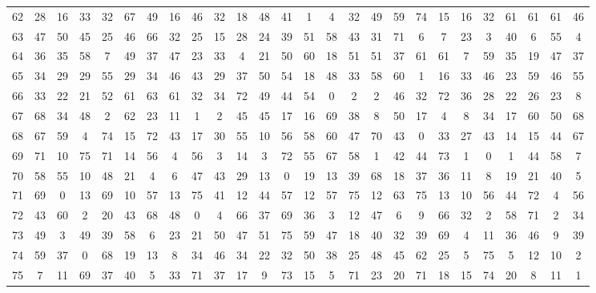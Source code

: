 \begin{table}
\begin{tabular}{c c c c c c c c c c c c c c c c c c c c c c c c c c }
62 & 28 & 16 & 33 & 32 & 67 & 49 & 16 & 46 & 32 & 18 & 48 & 41 & 1 & 4 & 32 & 49 & 59 & 74 & 15 & 16 & 32 & 61 & 61 & 61 & 46 \\
63 & 47 & 50 & 45 & 25 & 46 & 66 & 32 & 25 & 15 & 28 & 24 & 39 & 51 & 58 & 43 & 31 & 71 & 6 & 7 & 23 & 3 & 40 & 6 & 55 & 4 \\
64 & 36 & 35 & 58 & 7 & 49 & 37 & 47 & 23 & 33 & 4 & 21 & 50 & 60 & 18 & 51 & 51 & 37 & 61 & 61 & 7 & 59 & 35 & 19 & 47 & 37 \\
65 & 34 & 29 & 29 & 55 & 29 & 34 & 46 & 43 & 29 & 37 & 50 & 54 & 18 & 48 & 33 & 58 & 60 & 1 & 16 & 33 & 46 & 23 & 59 & 46 & 55 \\
66 & 33 & 22 & 21 & 52 & 61 & 63 & 61 & 32 & 34 & 72 & 49 & 44 & 54 & 0 & 2 & 2 & 46 & 32 & 72 & 36 & 28 & 22 & 26 & 23 & 8 \\
67 & 68 & 34 & 48 & 2 & 62 & 23 & 11 & 1 & 2 & 45 & 45 & 17 & 16 & 69 & 38 & 8 & 50 & 17 & 4 & 8 & 34 & 17 & 60 & 50 & 68 \\
68 & 67 & 59 & 4 & 74 & 15 & 72 & 43 & 17 & 30 & 55 & 10 & 56 & 58 & 60 & 47 & 70 & 43 & 0 & 33 & 27 & 43 & 14 & 15 & 44 & 67 \\
69 & 71 & 10 & 75 & 71 & 14 & 56 & 4 & 56 & 3 & 14 & 3 & 72 & 55 & 67 & 58 & 1 & 42 & 44 & 73 & 1 & 0 & 1 & 44 & 58 & 7 \\
70 & 58 & 55 & 10 & 48 & 21 & 4 & 6 & 47 & 43 & 29 & 13 & 0 & 19 & 13 & 39 & 68 & 18 & 37 & 36 & 11 & 8 & 19 & 21 & 40 & 5 \\
71 & 69 & 0 & 13 & 69 & 10 & 57 & 13 & 75 & 41 & 12 & 44 & 57 & 12 & 57 & 75 & 12 & 63 & 75 & 13 & 10 & 56 & 44 & 72 & 4 & 56 \\
72 & 43 & 60 & 2 & 20 & 43 & 68 & 48 & 0 & 4 & 66 & 37 & 69 & 36 & 3 & 12 & 47 & 6 & 9 & 66 & 32 & 2 & 58 & 71 & 2 & 34 \\
73 & 49 & 3 & 49 & 39 & 58 & 6 & 23 & 21 & 50 & 47 & 51 & 75 & 59 & 47 & 18 & 40 & 32 & 39 & 69 & 4 & 11 & 36 & 46 & 9 & 39 \\
74 & 59 & 37 & 0 & 68 & 19 & 13 & 8 & 34 & 46 & 34 & 22 & 32 & 50 & 38 & 25 & 48 & 45 & 62 & 25 & 5 & 75 & 5 & 12 & 10 & 2 \\
75 & 7 & 11 & 69 & 37 & 40 & 5 & 33 & 71 & 37 & 17 & 9 & 73 & 15 & 5 & 71 & 23 & 20 & 71 & 18 & 15 & 74 & 20 & 8 & 11 & 1 \\
\hline
\end{tabular}
\end{table}